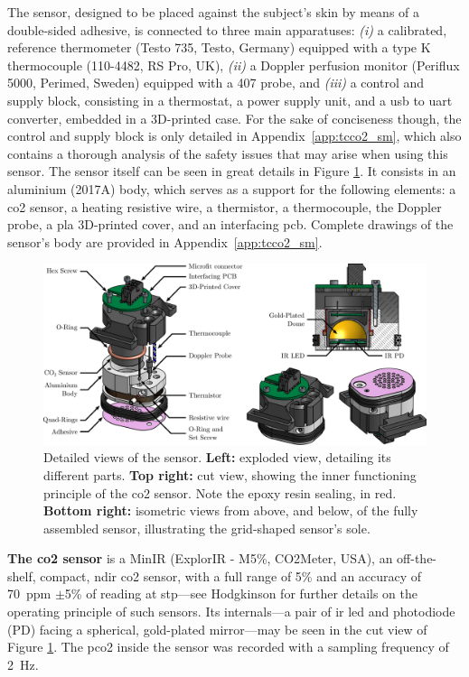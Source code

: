 The sensor, designed to be placed against the subject's skin by means of a double-sided adhesive, is connected to three main apparatuses: \textit{(i)} a calibrated, reference thermometer (Testo 735, Testo, Germany) equipped with a type K thermocouple (110-4482, RS Pro, UK), \textit{(ii)} a Doppler perfusion monitor (Periflux 5000, Perimed, Sweden) equipped with a 407 probe, and \textit{(iii)} a control and supply block, consisting in a thermostat, a power supply unit, and a \gls{usb} to \gls{uart} converter, embedded in a 3D-printed case. For the sake of conciseness though, the control and supply block is only detailed in Appendix~\ref{app:tcco2_sm}, which also contains a thorough analysis of the safety issues that may arise when using this sensor. The sensor itself can be seen in great details in Figure \ref{fig:tcco2:explo_cut}. It consists in an aluminium (2017A) body, which serves as a support for the following elements: a \gls{co2} sensor, a heating resistive wire, a thermistor, a thermocouple, the Doppler probe, a \gls{pla} 3D-printed cover, and an interfacing \gls{pcb}. Complete drawings of the sensor's body are provided in Appendix~\ref{app:tcco2_sm}.

\begin{figure}
	\centering
	\includegraphics[width=\linewidth]{1_main_matter/tcco2_figures//explo_cut.pdf}
	\caption[Detailed views of the sensor.]{Detailed views of the sensor. \textbf{Left:} exploded view, detailing its different parts. \textbf{Top right:} cut view, showing the inner functioning principle of the \gls{co2} sensor. Note the epoxy resin sealing, in red. \textbf{Bottom right:} isometric views from above, and below, of the fully assembled sensor, illustrating the grid-shaped sensor's sole.}\label{fig:tcco2:explo_cut}
\end{figure}

\textbf{The \gls{co2} sensor} is a MinIR (ExplorIR - M5\%, CO2Meter, USA), an off-the-shelf, compact, \gls{ndir} \gls{co2} sensor, with a full range of 5\% and an accuracy of 70~ppm $\pm$5\% of reading at \gls{stp}---see Hodgkinson \etal{}\cite{hodgkinson2012rev} for further details on the operating principle of such sensors. Its internals---a pair of \gls{ir} \gls{led} and photodiode (PD) facing a spherical, gold-plated mirror---may be seen in the cut view of Figure \ref{fig:tcco2:explo_cut}. The \gls{pco2} inside the sensor was recorded with a sampling frequency of 2~Hz.

